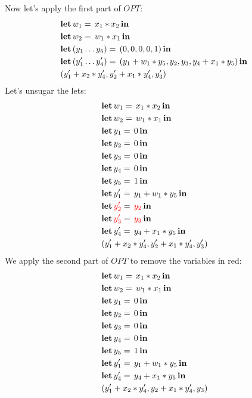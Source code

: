 \begin{example}
	Now let's apply the first part of $OPT$:
	\begin{align*}
		&\letin{w_1}{\var_1 * \var_2}{\\
		&\letin{w_2}{w_1 * \var_1}{\\
		&\letin{(\var[2]_1\ldots\var[2]_5)}{(0,0,0,0,1)}{\\
		& \letin{(\var[2]_1'\ldots\var[2]_4')}{(\var[2]_1+w_1 * \var[2]_5,\var[2]_2,\var[2]_3,\var[2]_4+ \var_1 * \var[2]_5)}{\\
		&(\var[2]_1'+\var_2*\var[2]_4',\var[2]_2'+\var_1*\var[2]_4',\var[2]_3')
		}}}}
	\end{align*}
Let's unsugar the lets:
	\begin{align*}
		&\letin{w_1}{\var_1 * \var_2}{\\
		&\letin{w_2}{w_1 * \var_1}{\\
		&\letin{\var[2]_1}{0}{\\
		&\letin{\var[2]_2}{0}{\\
		&\letin{\var[2]_3}{0}{\\
		&\letin{\var[2]_4}{0}{\\
		&\letin{\var[2]_5}{1}{\\
		& \letin{\var[2]_1'}{\var[2]_1+w_1 * \var[2]_5}{\\
		&\letin{ {\color{red} \var[2]_2'} }{  {\color{red} \var[2]_2} }{\\
		&\letin{ {\color{red} \var[2]_3'} }{ {\color{red} \var[2]_3}  }{\\
		&\letin{\var[2]_4'}{\var[2]_4+ \var_1 * \var[2]_5}{\\
		&(\var[2]_1'+\var_2*\var[2]_4',\var[2]_2'+\var_1*\var[2]_4',\var[2]_3')
		}}}}}}}}}}}
	\end{align*}
	We apply the second part of $OPT$ to remove the variables in red:
	\begin{align*}
		&\letin{w_1}{\var_1 * \var_2}{\\
		&\letin{w_2}{w_1 * \var_1}{\\
		&\letin{\var[2]_1}{0}{\\
		&\letin{\var[2]_2}{0}{\\
		&\letin{\var[2]_3}{0}{\\
		&\letin{\var[2]_4}{0}{\\
		&\letin{\var[2]_5}{1}{\\
		& \letin{\var[2]_1'}{\var[2]_1+w_1 * \var[2]_5}{\\
		&\letin{\var[2]_4'}{\var[2]_4+ \var_1 * \var[2]_5}{\\
		&(\var[2]_1'+\var_2*\var[2]_4',\var[2]_2+\var_1*\var[2]_4',\var[2]_3)
}}}}}}}}}
\end{align*}
\end{example}
